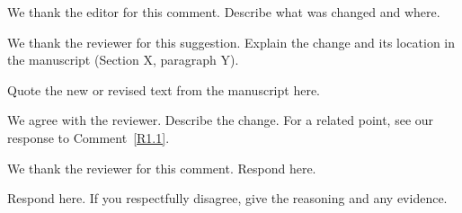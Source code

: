 \editor


\begin{response}
  We thank the editor for this comment. Describe what was changed and where.
\end{response}

\reviewer

\label{R1.1}

\begin{response}
  We thank the reviewer for this suggestion. Explain the change and its location in the manuscript (Section X, paragraph Y).

  \begin{revisedtext}
    Quote the new or revised text from the manuscript here.
  \end{revisedtext}
\end{response}


\begin{response}
  We agree with the reviewer. Describe the change. For a related point, see our response to Comment~\ref{R1.1}.
\end{response}

\reviewer


\begin{response}
  We thank the reviewer for this comment. Respond here.
\end{response}


\begin{response}
  Respond here. If you respectfully disagree, give the reasoning and any evidence.
\end{response}



